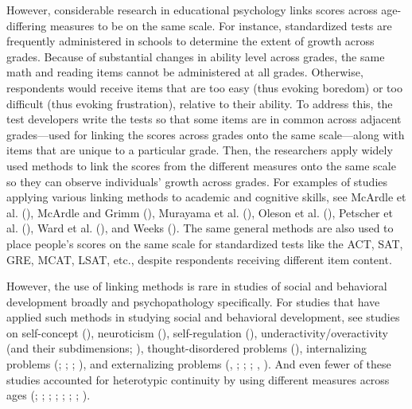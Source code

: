 \documentclass[
  american,
  letterpaper,
  12pt]{article}
\begin{document}
However, considerable research in educational psychology links scores
across age-differing measures to be on the same scale. For instance,
standardized tests are frequently administered in schools to determine
the extent of growth across grades. Because of substantial changes in
ability level across grades, the same math and reading items cannot be
administered at all grades. Otherwise, respondents would receive items
that are too easy (thus evoking boredom) or too difficult (thus evoking
frustration), relative to their ability. To address this, the test
developers write the tests so that some items are in common across
adjacent grades---used for linking the scores across grades onto the
same scale---along with items that are unique to a particular grade.
Then, the researchers apply widely used methods to link the scores from
the different measures onto the same scale so they can observe
individuals' growth across grades. For examples of studies applying
various linking methods to academic and cognitive skills, see McArdle et
al. (), McArdle and Grimm
(), Murayama et al.
(), Oleson et al.
(), Petscher et al.
(), Ward et al.
(), and Weeks
(). The same general methods are also used
to place people's scores on the same scale for standardized tests like
the ACT, SAT, GRE, MCAT, LSAT, etc., despite respondents receiving
different item content.

However, the use of linking methods is rare in studies of social and
behavioral development broadly and psychopathology specifically. For
studies that have applied such methods in studying social and behavioral
development, see studies on self-concept
(), neuroticism
(), self-regulation
(),
underactivity/overactivity (and their subdimensions;
),
thought-disordered problems (), internalizing problems
(;
;
;
), and externalizing
problems (,
; ; ; ,
). And even fewer of these studies
accounted for heterotypic continuity by using different measures across
ages (;
;
;
;
;
;
;
).
\end{document}
